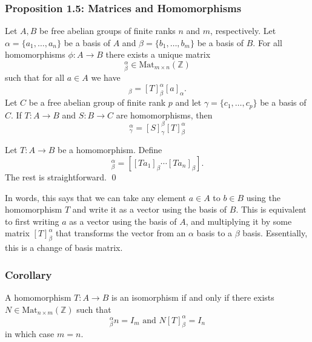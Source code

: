 \documentclass{article}
\renewenvironment{proof}{{\bfseries\color{blue1} Proof:}}{\qed}
\begin{document}
\subsubsection{Proposition 1.5: Matrices and Homomorphisms}
\begin{idea}
    Let $A,B$ be free abelian groups of finite ranks $n$ and $m$, respectively. Let $\alpha=\{a_1,\dots,a_n\}$ be a basis of $A$ and $\beta=\{b_1,\dots,b_m\}$ be a basis of $B$. For all homomorphisms $\phi: A\rightarrow B$ there exists a unique matrix
    \begin{equation*}
        [T]^\alpha_\beta \in \text{Mat}_{m\times n}(\mathbb{Z})
    \end{equation*}
    such that for all $a\in A$ we have
    \begin{equation*}
        [Ta]_\beta = [T]^\alpha_\beta [a]_\alpha.
    \end{equation*}
    Let $C$ be a free abelian group of finite rank $p$ and let $\gamma = \{c_1,\dots,c_p\}$ be a basis of $C$. If $T: A\rightarrow B$ and $S: B\rightarrow C$ are homomorphisms, then
    \begin{equation*}
        [S \circ T]^\alpha_\gamma = [S]^\beta_\gamma [T]^\alpha_\beta
    \end{equation*}
\end{idea}
\begin{proof}
    Let $T:A\rightarrow B$ be a homomorphism. Define
    \begin{equation*}
        [T]^\alpha_\beta = [[Ta_1]_\beta \cdots [Ta_n]_\beta].
    \end{equation*}
    The rest is straightforward.
\end{proof}

In words, this says that we can take any element $a \in A$ to $b \in B$ using the homomorphism $T$ and write it as a vector using the basis of $B$. This is equivalent to first writing $a$ as a vector using the basis of $A$, and multiplying it by some matrix $[T]^\alpha_\beta$ that transforms the vector from an $\alpha$ basis to a $\beta$ basis. Essentially, this is a change of basis matrix.
\subsubsection{Corollary}
\begin{idea}
    A homomorphism $T:A\rightarrow B$ is an isomorphism if and only if there exists $N\in \text{Mat}_{n\times m}(\mathbb{Z})$ such that
    \begin{equation*}
        [T]^\alpha_\beta n = I_m \text{ and } N[T]^\alpha_\beta = I_n
    \end{equation*}
    in which case $m=n$.
\end{idea}
\end{document}
